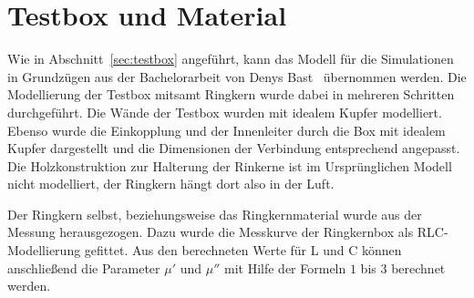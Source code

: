 \section{Testbox und Material}
Wie in Abschnitt~\ref{sec:testbox} angef\"uhrt, kann das Modell f\"ur die Simulationen in Grundz\"ugen aus der Bachelorarbeit von Denys Bast~\cite{bast2017ba} \"ubernommen werden. Die Modellierung der Testbox mitsamt Ringkern wurde dabei in mehreren Schritten durchgef\"uhrt. Die W\"ande der Testbox wurden mit idealem Kupfer modelliert. Ebenso wurde die Einkopplung und der Innenleiter durch die Box mit idealem Kupfer dargestellt und die Dimensionen der Verbindung entsprechend angepasst. Die Holzkonstruktion zur Halterung der Rinkerne ist im Urspr\"unglichen Modell nicht modelliert, der Ringkern h\"angt dort also in der Luft.
\par
Der Ringkern selbst, beziehungsweise das Ringkernmaterial wurde aus der Messung herausgezogen. Dazu wurde die Messkurve der Ringkernbox als RLC-Modellierung gefittet. Aus den berechneten Werte f\"ur L und C k\"onnen anschlie\ss{}end die Parameter $\mu'$ und $\mu''$ mit Hilfe der Formeln $1$ bis $3$ berechnet werden.
